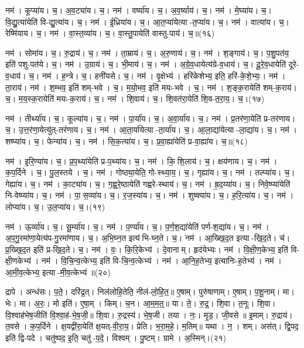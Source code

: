 नम॑। कूप्या॑य। च॒। अ॒व॒ट्या॑य। च॒।
नम॑। वर्ष्या॑य। च॒। अ॒व॒र्ष्याय॑। च॒।
नम॑। मे॒घ्या॑य। च॒। वि॒द्यु॒त्या॑येति॑ वि-द्यु॒त्या॑य। च॒।
नम॑। ई॒ध्रिया॑य। च॒। आ॒त॒प्या॑येत्या-त॒प्या॑य। च॒।
नम॑। वात्या॑य। च॒। रेष्मि॑याय। च॒।
नम॑। वा॒स्त॒व्या॑य। च॒। वा॒स्तु॒पायेति॑ वास्तु-पाय॑। च॒॥(१६)


नम॑। सोमा॑य। च॒। रु॒द्राय॑। च॒।
नम॑। ता॒म्राय॑। च॒। अ॒रु॒णाय॑। च॒।
नम॑। श॒ङ्गाय॑। च॒। प॒शु॒पत॑य॒ इति॑ पशु-पत॑ये। च॒।
नम॑। उ॒ग्राय॑। च॒। भी॒माय॑। च॒।
नम॑। अ॒ग्रे॒व॒धायेत्य॑ग्रे-व॒धाय॑। च॒। दू॒रे॒व॒धायेति॑ दूरे-व॒धाय॑। च॒।
नम॑। ह॒न्त्रे। च॒। हनी॑यसे। च॒।
नम॑। वृ॒क्षेभ्य॑। हरि॑केशेभ्य॒ इति॒ हरि॑-के॒शे॒भ्यः॒।
नम॑। ता॒राय॑। नम॑। श॒म्भव॒ इति॑ शम्-भवे। च॒। म॒यो॒भव॒ इति॑ मयः-भवे। च॒।
नम॑। श॒ङ्क॒रायेति॑ शम्-क॒राय॑। च॒। म॒य॒स्क॒रायेति॑ मयः-क॒राय॑। च॒।
नम॑। शि॒वाय॑। च॒। शि॒वत॑रा॒येति॑ शि॒व-त॒रा॒य॒। च॒।(१७)


नम॑। तीर्थ्या॑य। च॒। कूल्या॑य। च॒।
नम॑। पा॒र्या॑य। च॒। अ॒वा॒र्या॑य। च॒।
नम॑। प्र॒तर॑णा॒येति॑ प्र-तर॑णाय। च॒। उ॒त्त॒र॑णा॒येत्यु॑त्-तर॑णाय। च॒।
नम॑। आ॒ता॒र्या॑येत्या-ता॒र्या॑य। च॒। आ॒ला॒द्या॑येत्या-ला॒द्या॑य। च॒।
नम॑। शष्प्या॑य। च॒। फेन्या॑य। च॒।
नम॑। सि॒क॒त्या॑य। च॒। प्र॒वा॒ह्या॑येति॑ प्र-वा॒ह्या॑य। च॒॥(१८)


नम॑। इ॒रि॒ण्या॑य। च॒। प्र॒प॒थ्या॑येति॑ प्र-प॒थ्या॑य। च॒।
नम॑। कि॒शि॒लाय॑। च॒। क्षय॑णाय। च॒।
नम॑। क॒प॒र्दिने। च॒। पु॒ल॒स्तये। च॒।
नम॑। गोष्ठ्या॒येति॒ गो-स्थ्या॒य॒। च॒। गृह्या॑य। च॒।
नम॑। तल्प्या॑य। च॒। गेह्या॑य। च॒।
नम॑। का॒ट्या॑य। च॒। ग॒ह्व॒रे॒ष्ठायेति॑ गह्वरे-स्थाय॑। च॒।
नम॑। ह्र॒द॒य्या॑य। च॒। निवे॒ष्प्या॑येति॑ नि-वेष्प्या॑य। च॒।
नम॑। पा॒स॒व्या॑य। च॒। र॒ज॒स्या॑य। च॒।
नम॑। शुष्क्या॑य। च॒। ह॒रि॒त्या॑य। च॒।
नम॑। लोप्या॑य। च॒। उ॒ल॒प्या॑य। च॒।(१९)


नम॑। ऊ॒र्व्या॑य। च॒। सू॒र्म्या॑य। च॒।
नम॑। प॒र्ण्या॑य। च॒। प॒र्ण॒श॒द्या॑येति॑ पर्ण-श॒द्या॑य। च॒।
नम॑। अ॒प॒गु॒रमा॑णा॒येत्य॑प-गु॒रमा॑णाय। च॒। अ॒भि॒घ्न॒त इत्य॑भि-घ्न॒ते। च॒।
नम॑। आ॒ख्खि॒द॒त इत्या-खि॒द॒ते। च॑। प्र॒ख्खि॒द॒त इति॑ प्र-खि॒द॒ते। च॒।
नम॑। वः॒। कि॒रि॒केभ्य॑। दे॒वानाम्। हृद॑येभ्यः। नम॑। वि॒क्षी॒ण॒केभ्य॒ इति॑ वि-क्षी॒णकेभ्य॑। नम॑। वि॒चि॒न्व॒त्केभ्य॒ इति॑ वि-चि॒न्व॒त्केभ्य॑। नम॑। आ॒नि॒\ur{}ह॒तेभ्य॒ इत्यानिः-ह॒तेभ्य॑। नम॑। आ॒मी॒व॒त्केभ्य॒ इत्या-मी॒व॒त्केभ्य॑॥(२०)


द्रापे। अन्ध॑सः। प॒ते॒। दरि॑द्र॒त्। निल॑लोहि॒तेति॒ नील॑-लो॒हि॒त॒॥ ए॒षाम्। पुरु॑षाणाम्। ए॒षाम्। प॒शू॒नाम्। मा। भेः। मा। अ॒रः॒। मो इति॑। ए॒षा॒म्। किम्। च॒न। आ॒म॒म॒त्॒॥ या। ते॒। रु॒द्र॒। शि॒वा। त॒नूः। शि॒वा। वि॒श्वाह॑भेष॒जीति॑ वि॒श्वा॒ह॑-भे॒ष॒जी॒॥ शि॒वा। रु॒द्रस्य॑। भे॒ष॒जी। तया। नः॒। मृ॒ड॒। जी॒वसे॥ इ॒माम्। रु॒द्राय॑। त॒वसे। क॒प॒र्दिने। क्ष॒यद्वी॑रा॒येति॑ क्ष॒यत्-वी॒रा॒य॒। प्रेति। भ॒रा॒म॒हे॒। म॒तिम्॥ यथा। न॒। शम्। अस॑त्। द्वि॒पद॒ इति॑ द्वि-पदे। चतु॑ष्पद॒ इ॒ति॒ चतु॑-प॒दे॒। विश्वम्। पु॒ष्टम्। ग्रामे। अ॒स्मिन्।(२१)


